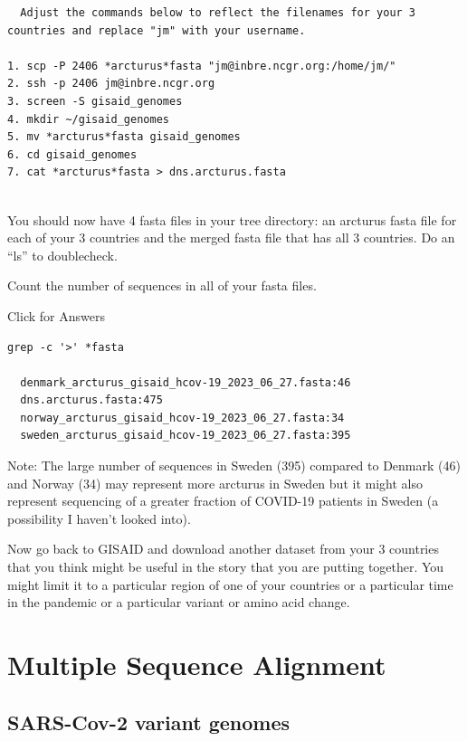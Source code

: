 \documentclass[
]{book}
\begin{document}
\begin{verbatim}
  Adjust the commands below to reflect the filenames for your 3 countries and replace "jm" with your username.
  
1. scp -P 2406 *arcturus*fasta "jm@inbre.ncgr.org:/home/jm/"
2. ssh -p 2406 jm@inbre.ncgr.org
3. screen -S gisaid_genomes
4. mkdir ~/gisaid_genomes
5. mv *arcturus*fasta gisaid_genomes
6. cd gisaid_genomes
7. cat *arcturus*fasta > dns.arcturus.fasta
  
\end{verbatim}

\hfill\break

You should now have 4 fasta files in your tree directory: an arcturus fasta file for each of your 3 countries and the merged fasta file that has all 3 countries. Do an ``ls'' to doublecheck.

Count the number of sequences in all of your fasta files.

Click for Answers

\begin{verbatim}
grep -c '>' *fasta

  denmark_arcturus_gisaid_hcov-19_2023_06_27.fasta:46
  dns.arcturus.fasta:475
  norway_arcturus_gisaid_hcov-19_2023_06_27.fasta:34
  sweden_arcturus_gisaid_hcov-19_2023_06_27.fasta:395
\end{verbatim}

\hfill\break

Note: The large number of sequences in Sweden (395) compared to Denmark (46) and Norway (34) may represent more arcturus in Sweden but it might also represent sequencing of a greater fraction of COVID-19 patients in Sweden (a possibility I haven't looked into).

Now go back to GISAID and download another dataset from your 3 countries that you think might be useful in the story that you are putting together. You might limit it to a particular region of one of your countries or a particular time in the pandemic or a particular variant or amino acid change.

\hypertarget{multiple-sequence-alignment}{%
\chapter{Multiple Sequence Alignment}\label{multiple-sequence-alignment}}

\hypertarget{sars-cov-2-variant-genomes}{%
\section{SARS-Cov-2 variant genomes}\label{sars-cov-2-variant-genomes}}
\end{document}
